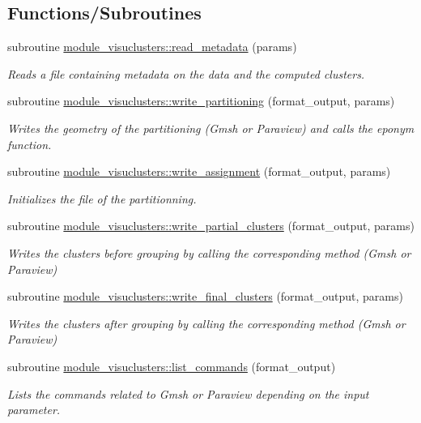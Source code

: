 \subsection*{Functions/\+Subroutines}
\begin{DoxyCompactItemize}
\item 
subroutine \hyperlink{namespacemodule__visuclusters_ab68939a34024c66e1e7cc64a0dcf8736}{module\+\_\+visuclusters\+::read\+\_\+metadata} (params)
\begin{DoxyCompactList}\small\item\em Reads a file containing metadata on the data and the computed clusters. \end{DoxyCompactList}\item 
subroutine \hyperlink{namespacemodule__visuclusters_adae3f4360febb54cb901ce9f591d8656}{module\+\_\+visuclusters\+::write\+\_\+partitioning} (format\+\_\+output, params)
\begin{DoxyCompactList}\small\item\em Writes the geometry of the partitioning (Gmsh or Paraview) and calls the eponym function. \end{DoxyCompactList}\item 
subroutine \hyperlink{namespacemodule__visuclusters_a11320cacc6eae8f372b75e9ec61b38b6}{module\+\_\+visuclusters\+::write\+\_\+assignment} (format\+\_\+output, params)
\begin{DoxyCompactList}\small\item\em Initializes the file of the partitionning. \end{DoxyCompactList}\item 
subroutine \hyperlink{namespacemodule__visuclusters_a426807700ec2991178bd989694a2ff17}{module\+\_\+visuclusters\+::write\+\_\+partial\+\_\+clusters} (format\+\_\+output, params)
\begin{DoxyCompactList}\small\item\em Writes the clusters before grouping by calling the corresponding method (Gmsh or Paraview) \end{DoxyCompactList}\item 
subroutine \hyperlink{namespacemodule__visuclusters_adf901cfd1bc769cadd3558369594b074}{module\+\_\+visuclusters\+::write\+\_\+final\+\_\+clusters} (format\+\_\+output, params)
\begin{DoxyCompactList}\small\item\em Writes the clusters after grouping by calling the corresponding method (Gmsh or Paraview) \end{DoxyCompactList}\item 
subroutine \hyperlink{namespacemodule__visuclusters_aeed2c5753cf8c47dadf20e55474c830b}{module\+\_\+visuclusters\+::list\+\_\+commands} (format\+\_\+output)
\begin{DoxyCompactList}\small\item\em Lists the commands related to Gmsh or Paraview depending on the input parameter. \end{DoxyCompactList}\end{DoxyCompactItemize}
